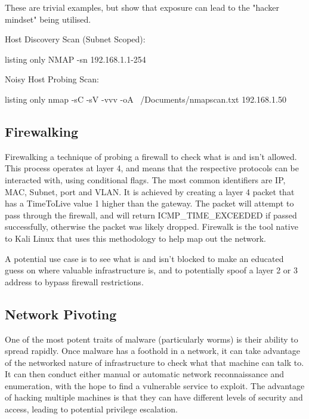 These are trivial examples, but show that exposure can lead to the "hacker mindset" being utilised.

Host Discovery Scan (Subnet Scoped):
\begin{tcblisting}{listing only}
    NMAP -sn 192.168.1.1-254
\end{tcblisting}

Noisy Host Probing Scan:
\begin{tcblisting}{listing only}
nmap -sC -sV -vvv -oA  ~/Documents/nmapscan.txt 192.168.1.50
\end{tcblisting}



\subsection{Firewalking}
Firewalking a technique of probing a firewall to check what is and isn't allowed. This process operates at layer 4, and means that the respective protocols can be interacted with, using conditional flags. The most common identifiers are IP, MAC, Subnet, port and VLAN.
It is achieved by creating a layer 4 packet that has a TimeToLive value 1 higher than the gateway. The packet will attempt to pass through the firewall, and will return ICMP_TIME_EXCEEDED if passed successfully, otherwise the packet was likely dropped. Firewalk is the tool native
to Kali Linux that uses this methodology to help map out the network. \citep{Firewalk}

A potential use case is to see what is and isn't blocked to make an educated guess on where valuable infrastructure is, and to potentially spoof a layer 2 or 3 address to bypass firewall restrictions.

\subsection{Network Pivoting}
One of the most potent traits of malware (particularly worms) is their ability to spread rapidly. Once malware has a foothold in a network, it can take advantage of the networked nature of infrastructure to check what that machine can talk to.
It can then conduct either manual or automatic network reconnaissance and enumeration, with the hope to find a vulnerable service to exploit. The advantage of hacking multiple machines is that they can have different levels of security and access, 
leading to potential privilege escalation. 


